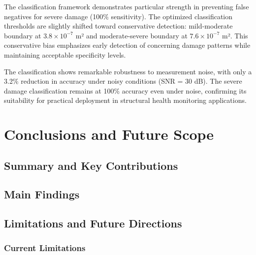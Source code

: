 \documentclass[12pt,a4paper]{report}
\begin{document}
The classification framework demonstrates particular strength in preventing false negatives for severe damage (100\% sensitivity). The optimized classification thresholds are slightly shifted toward conservative detection: mild-moderate boundary at $3.8 \times 10^{-7}$ m² and moderate-severe boundary at $7.6 \times 10^{-7}$ m². This conservative bias emphasizes early detection of concerning damage patterns while maintaining acceptable specificity levels.

The classification shows remarkable robustness to measurement noise, with only a 3.2\% reduction in accuracy under noisy conditions (SNR = 30 dB). The severe damage classification remains at 100\% accuracy even under noise, confirming its suitability for practical deployment in structural health monitoring applications.




\chapter{Conclusions and Future Scope}
\label{chap:conclusions}

\section{Summary and Key Contributions}


\section{Main Findings}


\section{Limitations and Future Directions}

\subsection{Current Limitations}
\end{document}
